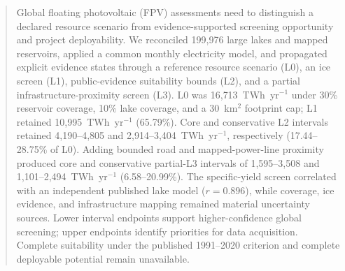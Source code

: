 \begin{abstract}
Global floating photovoltaic (FPV) assessments need to distinguish a declared resource scenario from evidence-supported screening opportunity and project deployability. We reconciled 199{,}976 large lakes and mapped reservoirs, applied a common monthly electricity model, and propagated explicit evidence states through a reference resource scenario (L0), an ice screen (L1), public-evidence suitability bounds (L2), and a partial infrastructure-proximity screen (L3). L0 was 16{,}713~TWh~yr$^{-1}$ under 30\% reservoir coverage, 10\% lake coverage, and a 30~km$^2$ footprint cap; L1 retained 10{,}995~TWh~yr$^{-1}$ (65.79\%). Core and conservative L2 intervals retained 4{,}190--4{,}805 and 2{,}914--3{,}404~TWh~yr$^{-1}$, respectively (17.44--28.75\% of L0). Adding bounded road and mapped-power-line proximity produced core and conservative partial-L3 intervals of 1{,}595--3{,}508 and 1{,}101--2{,}494~TWh~yr$^{-1}$ (6.58--20.99\%). The specific-yield screen correlated with an independent published lake model ($r=0.896$), while coverage, ice evidence, and infrastructure mapping remained material uncertainty sources. Lower interval endpoints support higher-confidence global screening; upper endpoints identify priorities for data acquisition. Complete suitability under the published 1991--2020 criterion and complete deployable potential remain unavailable.
\end{abstract}

